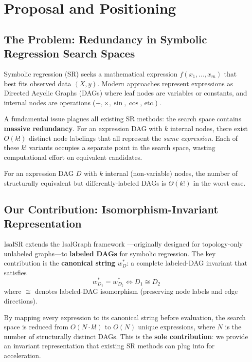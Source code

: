 \section{Proposal and Positioning}
\label{sec:proposal}

\subsection{The Problem: Redundancy in Symbolic Regression Search Spaces}

Symbolic regression (SR) seeks a mathematical expression $f(x_1, \ldots, x_m)$
that best fits observed data $(X, y)$. Modern approaches represent expressions
as Directed Acyclic Graphs (DAGs) where leaf nodes are variables or constants,
and internal nodes are operations ($+, \times, \sin, \cos$, etc.)
\cite{liu2025, petersen2021}.

A fundamental issue plagues all existing SR methods: the search space contains
\textbf{massive redundancy}. For an expression DAG with $k$ internal nodes,
there exist $O(k!)$ distinct node labelings that all represent the
\emph{same expression}. Each of these $k!$ variants occupies a separate point
in the search space, wasting computational effort on equivalent candidates.

\begin{proposition}
For an expression DAG $D$ with $k$ internal (non-variable) nodes,
the number of structurally equivalent but differently-labeled DAGs is
$\Theta(k!)$ in the worst case.
\end{proposition}

\subsection{Our Contribution: Isomorphism-Invariant Representation}

IsalSR extends the IsalGraph framework \cite{lopezrubio2025}---originally
designed for topology-only unlabeled graphs---to \textbf{labeled DAGs} for
symbolic regression. The key contribution is the \textbf{canonical string}
$w^*_D$: a complete labeled-DAG invariant that satisfies
\begin{equation}
  w^*_{D_1} = w^*_{D_2} \iff D_1 \cong D_2
  \label{eq:invariant}
\end{equation}
where $\cong$ denotes labeled-DAG isomorphism (preserving node labels and
edge directions).

By mapping every expression to its canonical string before evaluation,
the search space is reduced from $O(N \cdot k!)$ to $O(N)$ unique expressions,
where $N$ is the number of structurally distinct DAGs. This is the
\textbf{sole contribution}: we provide an invariant representation that
existing SR methods can plug into for acceleration.

